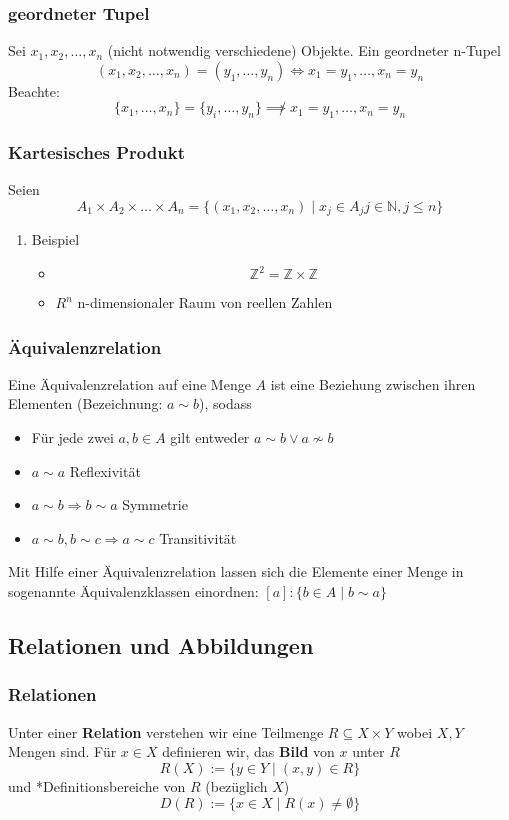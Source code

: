 \documentclass[11pt]{article}
\begin{document}
\subsubsection{geordneter Tupel}
\label{sec-2-2-6}
Sei $x_1, x_2, \ldots, x_n$ (nicht notwendig verschiedene) Objekte. Ein geordneter n-Tupel \[(x_1,x_2,\ldots,x_n) = (y_1,\ldots,y_n) \Leftrightarrow x_1 = y_1, \ldots, x_n = y_n\]
Beachte:
\[\{x_1, \ldots, x_n\} = \{y_i,\ldots,y_n\}\not\implies x_1 = y_1, \ldots, x_n = y_n\]
\subsubsection{Kartesisches Produkt}
\label{sec-2-2-7}
Seien \[A_1\times A_2\times \ldots \times A_n = \{(x_1,x_2,\ldots,x_n)\mid x_j \in A_j j\in\mathbb{N}, j \leq n\}\]
\begin{enumerate}
\item Beispiel
\label{sec-2-2-7-1}
\begin{itemize}
\item \[\mathbb{Z}^2 = \mathbb{Z}\times \mathbb{Z}\]
\item $R^n$ n-dimensionaler Raum von reellen Zahlen
\end{itemize}
\end{enumerate}
\subsubsection{Äquivalenzrelation}
\label{sec-2-2-8}
Eine Äquivalenzrelation auf eine Menge $A$ ist eine Beziehung zwischen ihren Elementen (Bezeichnung: $a \sim b$), sodass
\begin{itemize}
\item Für jede zwei $a,b\in A$ gilt entweder $a\sim b \vee a\not\sim b$
\item $a\sim a$ \hfill Reflexivität
\item $a\sim b \Rightarrow b\sim a$ \hfill Symmetrie
\item $a \sim b, b \sim c \Rightarrow a \sim c$ \hfill Transitivität
\end{itemize}
Mit Hilfe einer Äquivalenzrelation lassen sich die Elemente einer Menge in sogenannte Äquivalenzklassen einordnen: $[a]:\{b\in A\mid b\sim a\}$
\subsection{Relationen und Abbildungen}
\label{sec-2-3}
\subsubsection{Relationen}
\label{sec-2-3-1}
Unter einer \textbf{Relation} verstehen wir eine Teilmenge $R\subseteq X\times Y$ wobei $X, Y$ Mengen sind. Für $x\in X$ definieren wir, das \textbf{Bild} von $x$ unter $R$
\[R(X) := \{y\in Y \mid (x,y) \in R\}\]
und *Definitionsbereiche von $R$ (bezüglich $X$)
\[D(R):= \{x\in X\mid R(x)\neq\emptyset\}\]
\end{document}
